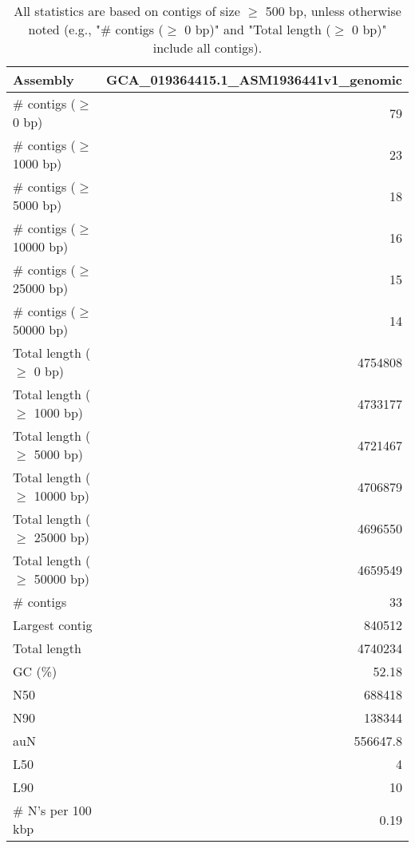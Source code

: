 \documentclass[12pt,a4paper]{article}
\begin{document}
\begin{table}[ht]
\begin{center}
\caption{All statistics are based on contigs of size $\geq$ 500 bp, unless otherwise noted (e.g., "\# contigs ($\geq$ 0 bp)" and "Total length ($\geq$ 0 bp)" include all contigs).}
\begin{tabular}{|l*{1}{|r}|}
\hline
Assembly & GCA\_019364415.1\_ASM1936441v1\_genomic \\ \hline
\# contigs ($\geq$ 0 bp) & 79 \\ \hline
\# contigs ($\geq$ 1000 bp) & 23 \\ \hline
\# contigs ($\geq$ 5000 bp) & 18 \\ \hline
\# contigs ($\geq$ 10000 bp) & 16 \\ \hline
\# contigs ($\geq$ 25000 bp) & 15 \\ \hline
\# contigs ($\geq$ 50000 bp) & 14 \\ \hline
Total length ($\geq$ 0 bp) & 4754808 \\ \hline
Total length ($\geq$ 1000 bp) & 4733177 \\ \hline
Total length ($\geq$ 5000 bp) & 4721467 \\ \hline
Total length ($\geq$ 10000 bp) & 4706879 \\ \hline
Total length ($\geq$ 25000 bp) & 4696550 \\ \hline
Total length ($\geq$ 50000 bp) & 4659549 \\ \hline
\# contigs & 33 \\ \hline
Largest contig & 840512 \\ \hline
Total length & 4740234 \\ \hline
GC (\%) & 52.18 \\ \hline
N50 & 688418 \\ \hline
N90 & 138344 \\ \hline
auN & 556647.8 \\ \hline
L50 & 4 \\ \hline
L90 & 10 \\ \hline
\# N's per 100 kbp & 0.19 \\ \hline
\end{tabular}
\end{center}
\end{table}
\end{document}
